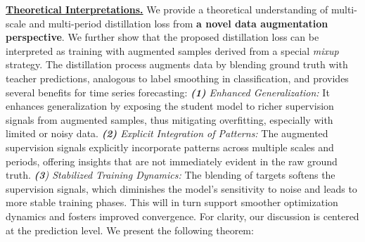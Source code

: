 \underline{\textbf{Theoretical Interpretations.}} We provide a theoretical understanding of multi-scale and multi-period distillation loss from \textbf{a novel data augmentation perspective}. We further show that the proposed distillation loss can be interpreted as training with augmented samples derived from a special \textit{mixup}~\cite{mixup} strategy. The distillation process augments data by blending ground truth with teacher predictions, analogous to label smoothing in classification, and provides several benefits for time series forecasting:
\textit{\textbf{(1)} Enhanced Generalization:} It enhances generalization by exposing the student model to richer supervision signals from augmented samples, thus mitigating overfitting, especially with limited or noisy data.
{\textit{\textbf{(2)} Explicit Integration of Patterns:} The augmented supervision signals explicitly incorporate patterns across multiple scales and periods, offering insights that are not immediately evident in the raw ground truth.}
\textit{\textbf{(3}) Stabilized Training Dynamics:} The blending of targets softens the supervision signals, which diminishes the model’s sensitivity to noise and leads to more stable training phases. This will in turn support smoother optimization dynamics and fosters improved convergence. For clarity, our discussion is centered at the prediction level.  We present the following theorem:  
